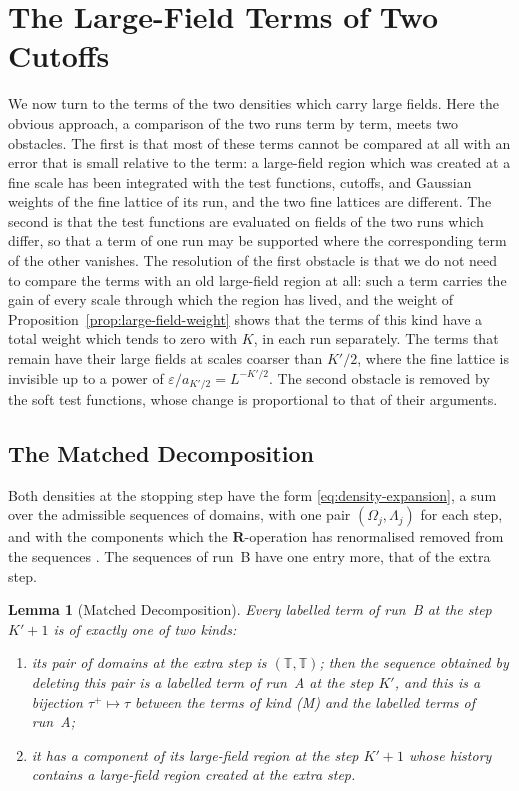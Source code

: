 \documentclass[11pt]{preprint}
\numberwithin{equation}{section}
\newtheorem{lemma}[theorem]{Lemma}
\theoremstyle{definition}
\theoremstyle{remark}
\theoremstyle{plain}
\begin{document}
\section{The Large-Field Terms of Two Cutoffs}\label{sec:large-field-comparison}

We now turn to the terms of the two densities which carry large fields. Here the obvious approach, a comparison of the two runs term by term, meets two obstacles. The first is that most of these terms cannot be compared at all with an error that is small relative to the term: a large-field region which was created at a fine scale has been integrated with the test functions, cutoffs, and Gaussian weights of the fine lattice of its run, and the two fine lattices are different. The second is that the test functions are evaluated on fields of the two runs which differ, so that a term of one run may be supported where the corresponding term of the other vanishes. The resolution of the first obstacle is that we do not need to compare the terms with an old large-field region at all: such a term carries the gain of every scale through which the region has lived, and the weight of Proposition~\ref{prop:large-field-weight} shows that the terms of this kind have a total weight which tends to zero with $K$, in each run separately. The terms that remain have their large fields at scales coarser than $K'/2$, where the fine lattice is invisible up to a power of $\varepsilon/a_{K'/2} = L^{-K'/2}$. The second obstacle is removed by the soft test functions, whose change is proportional to that of their arguments.

\subsection{The Matched Decomposition}\label{sec:matched-decomposition}

Both densities at the stopping step have the form \eqref{eq:density-expansion}, a sum over the admissible sequences of domains, with one pair $(\Omega_j, \Lambda_j)$ for each step, and with the components which the $\mathbf R$-operation has renormalised removed from the sequences \cite[(0.3), p.~176]{BalabanLFR1}. The sequences of run~B have one entry more, that of the extra step.

\begin{lemma}[Matched Decomposition]\label{lem:matched-decomposition}
Every labelled term of run~B at the step $K' + 1$ is of exactly one of two kinds:
\begin{enumerate}[label=(\Alph*)]
\item[(M)] its pair of domains at the extra step is $(\mathbb T, \mathbb T)$; then the sequence obtained by deleting this pair is a labelled term of run~A at the step $K'$, and this is a bijection $\tau^+ \mapsto \tau$ between the terms of kind (M) and the labelled terms of run~A;
\item[(U)] it has a component of its large-field region at the step $K' + 1$ whose history contains a large-field region created at the extra step.
\end{enumerate}
\end{lemma}
\end{document}
